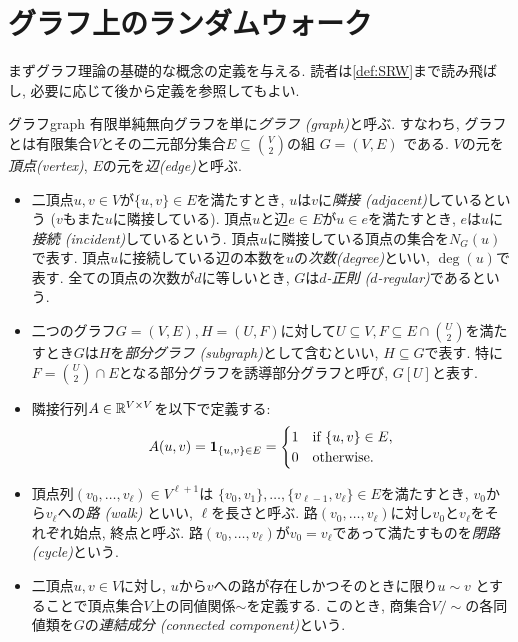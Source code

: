 \section{グラフ上のランダムウォーク}
まずグラフ理論の基礎的な概念の定義を与える.
読者は\cref{def:SRW}まで読み飛ばし, 必要に応じて後から定義を参照してもよい.
%
\begin{definition}{グラフ}{graph}
  有限単純無向グラフを単に\emph{グラフ (graph)}と呼ぶ.
  すなわち, グラフとは有限集合$V$とその二元部分集合$E\subseteq \binom{V}{2}$の組 $G = (V, E)$ である.
  $V$の元を\emph{頂点(vertex)}, $E$の元を\emph{辺(edge)}と呼ぶ.
  \begin{itemize}
    \item 二頂点$u,v\in V$が$\{u,v\}\in E$を満たすとき, $u$は$v$に\emph{隣接 (adjacent)}しているという ($v$もまた$u$に隣接している).
          頂点$u$と辺$e\in E$が$u\in e$を満たすとき, $e$は$u$に\emph{接続 (incident)}しているという.
          頂点$u$に隣接している頂点の集合を$N_G(u)$で表す.
          頂点$u$に接続している辺の本数を$u$の\emph{次数(degree)}といい, $\deg(u)$で表す.
          全ての頂点の次数が$d$に等しいとき, $G$は\emph{$d$-正則 ($d$-regular)}であるという.
    \item 二つのグラフ$G=(V,E),H=(U,F)$に対して$U\subseteq V,F\subseteq E \cap \binom{U}{2}$を満たすとき$G$は$H$を\emph{部分グラフ (subgraph)}として含むといい, $H\subseteq G$で表す.
    特に$F=\binom{U}{2}\cap E$となる部分グラフを誘導部分グラフと呼び, $G[U]$と表す.
    \item 隣接行列$A \in \mathbb{R}^{V\times V}$を以下で定義する:
          \[
            A(u,v) = \mathbf{1}_{\{u,v\}\in E} =
            \begin{cases}
              1 & \text{if }\{u,v\}\in E, \\
              0 & \text{otherwise}.
            \end{cases}
          \]
    \item 頂点列$(v_0,\dots,v_\ell) \in V^{\ell+1}$は
          $\{v_0,v_1\},\dots,\{v_{\ell-1},v_\ell\}\in E$を満たすとき,
          $v_0$から$v_\ell$への\emph{路 (walk)} といい, $\ell$を長さと呼ぶ.
          路$(v_0,\dots,v_\ell)$に対し$v_0$と$v_\ell$をそれぞれ始点, 終点と呼ぶ.
          路$(v_0,\dots,v_\ell)$が$v_0=v_\ell$であって満たすものを\emph{閉路 (cycle)}という.
    \item  二頂点$u,v \in V$に対し,
          $u$から$v$への路が存在しかつそのときに限り$u\sim v$
          とすることで頂点集合$V$上の同値関係$\sim$を定義する.
          このとき, 商集合$V / \sim$の各同値類を$G$の\emph{連結成分 (connected component)}という.

\end{itemize}
\end{definition}
